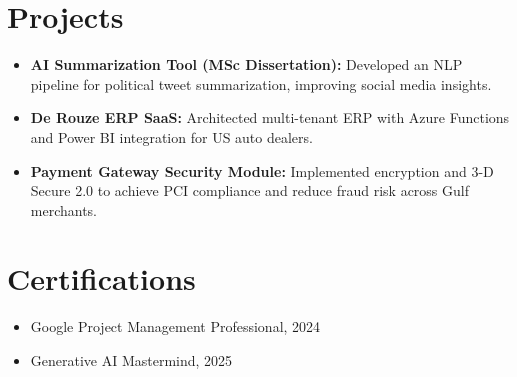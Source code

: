 \documentclass[letterpaper,10pt]{article}
\begin{document}
\section{Projects}
\begin{itemize}
    \setlength\itemsep{3pt}
    \item \textbf{AI Summarization Tool (MSc Dissertation):} Developed an NLP pipeline for political tweet summarization, improving social media insights.
    \item \textbf{De Rouze ERP SaaS:} Architected multi-tenant ERP with Azure Functions and Power BI integration for US auto dealers.
    \item \textbf{Payment Gateway Security Module:} Implemented encryption and 3-D Secure 2.0 to achieve PCI compliance and reduce fraud risk across Gulf merchants.
\end{itemize}

\section{Certifications}
\begin{itemize}
    \item Google Project Management Professional, 2024
    \item Generative AI Mastermind, 2025
\end{itemize}

\vspace*{\fill}
\end{document}
